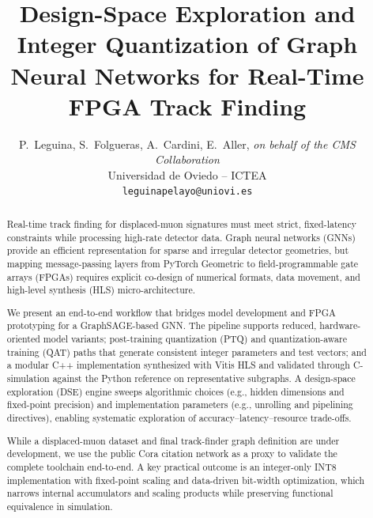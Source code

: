 \documentclass[onecolumn]{IEEEtran}
\begin{document}
\title{Design-Space Exploration and Integer Quantization of Graph Neural Networks for Real-Time FPGA Track Finding}

\author{P.\ Leguina, S.\ Folgueras, A.\ Cardini, E.\ Aller, \emph{on behalf of the CMS Collaboration}\\
Universidad de Oviedo -- ICTEA\\
\texttt{leguinapelayo@uniovi.es}
}

\maketitle

\begin{abstract}
Real-time track finding for displaced-muon signatures must meet strict, fixed-latency constraints while processing high-rate detector data. Graph neural networks (GNNs) provide an efficient representation for sparse and irregular detector geometries, but mapping message-passing layers from PyTorch Geometric to field-programmable gate arrays (FPGAs) requires explicit co-design of numerical formats, data movement, and high-level synthesis (HLS) micro-architecture.

We present an end-to-end workflow that bridges model development and FPGA prototyping for a GraphSAGE-based GNN. The pipeline supports reduced, hardware-oriented model variants; post-training quantization (PTQ) and quantization-aware training (QAT) paths that generate consistent integer parameters and test vectors; and a modular C++ implementation synthesized with Vitis HLS and validated through C-simulation against the Python reference on representative subgraphs. A design-space exploration (DSE) engine sweeps algorithmic choices (e.g., hidden dimensions and fixed-point precision) and implementation parameters (e.g., unrolling and pipelining directives), enabling systematic exploration of accuracy--latency--resource trade-offs.

While a displaced-muon dataset and final track-finder graph definition are under development, we use the public Cora citation network as a proxy to validate the complete toolchain end-to-end. A key practical outcome is an integer-only INT8 implementation with fixed-point scaling and data-driven bit-width optimization, which narrows internal accumulators and scaling products while preserving functional equivalence in simulation.
\end{abstract}
\end{document}
